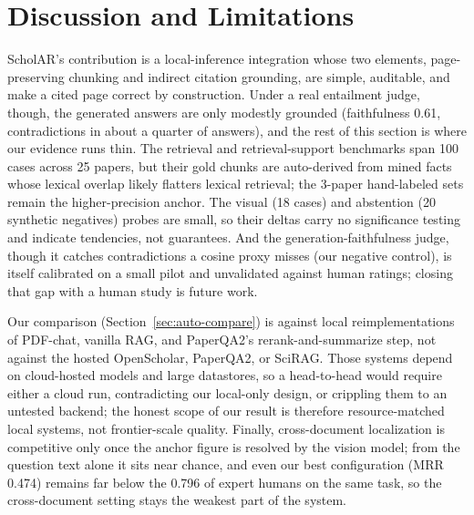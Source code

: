 \documentclass[11pt,letterpaper]{article}
\begin{document}
\section{Discussion and Limitations}
ScholAR's contribution is a local-inference integration whose two elements, page-preserving
chunking and indirect citation grounding, are simple, auditable, and make a cited page correct
by construction. Under a real entailment judge, though, the generated answers are only modestly
grounded (faithfulness 0.61, contradictions in about a quarter of answers), and the rest of this
section is where our evidence runs thin. The retrieval and retrieval-support benchmarks span 100 cases
across 25 papers, but their gold chunks are auto-derived from mined facts whose lexical overlap
likely flatters lexical retrieval; the 3-paper hand-labeled sets remain the higher-precision
anchor. The visual (18 cases) and abstention (20 synthetic negatives) probes are small, so their
deltas carry no significance testing and indicate tendencies, not guarantees. And the
generation-faithfulness judge, though it catches contradictions a cosine proxy misses (our negative
control), is itself calibrated on a small pilot and unvalidated against human ratings; closing that
gap with a human study is future work.

Our comparison (Section~\ref{sec:auto-compare}) is against local reimplementations of
PDF-chat, vanilla RAG, and PaperQA2's rerank-and-summarize step, not against the
hosted OpenScholar, PaperQA2, or SciRAG. Those systems depend on cloud-hosted models
and large datastores, so a head-to-head would require either a cloud run, contradicting
our local-only design, or crippling them to an untested backend; the honest scope of
our result is therefore resource-matched local systems, not frontier-scale quality.
Finally, cross-document localization is competitive only once the anchor figure is
resolved by the vision model; from the question text alone it sits near chance, and even
our best configuration (MRR 0.474) remains far below the 0.796 of expert humans on the
same task, so the cross-document setting stays the weakest part of the system.

\end{document}
